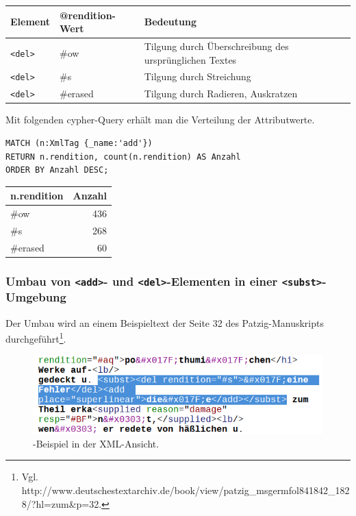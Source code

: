 \documentclass[ngerman,]{scrreprt}
\begin{document}
\begin{longtable}[]{@{}lll@{}}
\toprule
Element & @rendition-Wert & Bedeutung\tabularnewline
\midrule
\endhead
\texttt{\textless{}del\textgreater{}} & \#ow & Tilgung durch Überschreibung des ursprünglichen Textes\tabularnewline
\texttt{\textless{}del\textgreater{}} & \#s & Tilgung durch Streichung\tabularnewline
\texttt{\textless{}del\textgreater{}} & \#erased & Tilgung durch Radieren, Auskratzen\tabularnewline
\bottomrule
\end{longtable}

Mit folgenden cypher-Query erhält man die Verteilung der Attributwerte.

\begin{verbatim}
MATCH (n:XmlTag {_name:'add'})
RETURN n.rendition, count(n.rendition) AS Anzahl
ORDER BY Anzahl DESC;
\end{verbatim}

\begin{longtable}[]{@{}lr@{}}
\toprule
n.rendition & Anzahl\tabularnewline
\midrule
\endhead
\#ow & 436\tabularnewline
\#s & 268\tabularnewline
\#erased & 60\tabularnewline
\bottomrule
\end{longtable}

\subsubsection{\texorpdfstring{Umbau von \texttt{\textless{}add\textgreater{}}- und \texttt{\textless{}del\textgreater{}}-Elementen in einer \texttt{\textless{}subst\textgreater{}}-Umgebung}{Umbau von \textless{}add\textgreater{}- und \textless{}del\textgreater{}-Elementen in einer \textless{}subst\textgreater{}-Umgebung}}\label{umbau-von-add--und-del-elementen-in-einer-subst-umgebung}

Der Umbau wird an einem Beispieltext der Seite 32 des Patzig-Manuskripts durchgeführt\footnote{Vgl. http://www.deutschestextarchiv.de/book/view/patzig\_msgermfol841842\_1828/?hl=zum\&p=32.}.

\begin{figure}
\centering
\includegraphics{Bilder/TEI2Graph/subst-xml-Beispiel.png}
\caption{-Beispiel in der XML-Ansicht.}
\end{figure}
\end{document}
